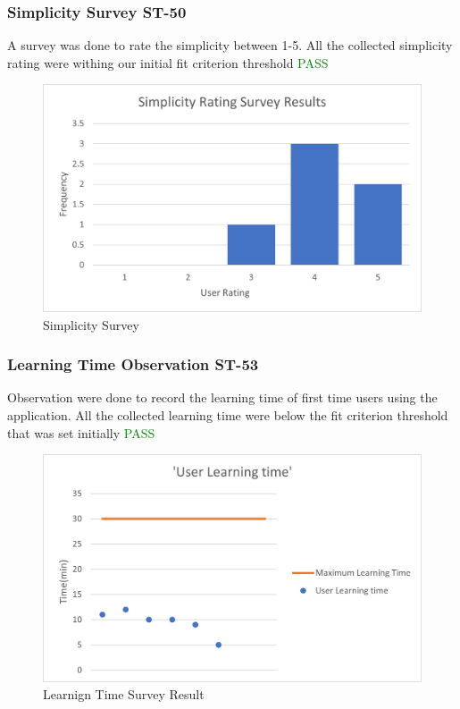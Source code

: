 \documentclass[12pt, titlepage]{article}
\begin{document}
\subsubsection{Simplicity Survey ST-50}
A survey was done to rate the simplicity between 1-5. All the collected simplicity rating were withing our initial fit criterion threshold \textcolor{green}{PASS}
\begin{figure}[H]
\centering
\includegraphics[]{simplicitysurvey}
\caption{Simplicity Survey}
\end{figure}

\subsubsection{Learning Time Observation ST-53}
Observation were done to record the learning time of first time users using the application. All the collected learning time were below the fit criterion threshold that was set initially \textcolor{green}{PASS}
\begin{figure}[H]
\centering
\includegraphics[]{learningtime}
\caption{Learnign Time Survey Result}
\end{figure}
\end{document}

